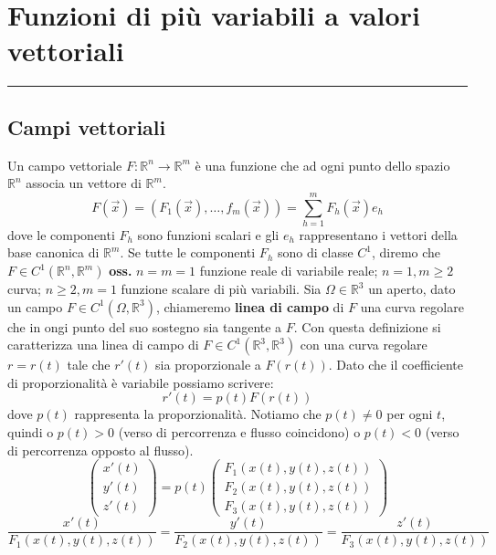 \section*{Funzioni di più variabili a valori vettoriali}
\rule{\textwidth}{2pt}
\subsection*{Campi vettoriali}
Un campo vettoriale $F: \mathbb{R}^n \rightarrow  \mathbb{R}^m$ è una funzione che ad ogni  punto dello spazio $\mathbb{R}^n$ associa un vettore di $\mathbb{R}^m$.
\[
    F(\vec{x}) = \left(F_1(\vec{x}), \dots, f_m(\vec{x})\right) = \sum_{h=1}^{m} F_h(\vec{x})e_h
\]
dove le componenti $F_h$ sono funzioni scalari e gli $e_h$ rappresentano i vettori della base canonica di $\mathbb{R}^m$. Se tutte le componenti $F_h$ sono di classe $C^1$, diremo che $F \in C^1(\mathbb{R}^n, \mathbb{R}^m)$\newline
\newline
\textbf{oss.} $n=m=1$ funzione reale di variabile reale; $n=1, m \geq 2$ curva; $n \geq 2, m = 1$ funzione scalare di più variabili.\newline
\newline
Sia $\Omega \in \mathbb{R}^3$ un aperto, dato un campo $F \in C^1(\Omega, \mathbb{R}^3)$, chiameremo \textbf{linea di campo} di $F$ una curva regolare che in ongi punto del suo sostegno sia tangente a $F$.\newline
Con questa definizione si caratterizza una linea di campo di $F \in C^1(\mathbb{R}^3, \mathbb{R}^3)$ con una curva regolare $r = r(t)$ tale che $r'(t)$ sia proporzionale a $F(r(t))$. Dato che il coefficiente di proporzionalità è variabile possiamo scrivere:
\[
    r'(t) = p(t) F(r(t))
\]
dove $p(t)$ rappresenta la proporzionalità. Notiamo che $p(t) \neq 0$ per ogni $t$, quindi o $p(t) > 0$ (verso di percorrenza e flusso coincidono) o $p(t) < 0$ (verso di percorrenza opposto al flusso).
\[
    \left(\begin{matrix}
        x'(t)\\
        y'(t)\\
        z'(t)
    \end{matrix}\right) = p(t) \left(\begin{matrix}
        F_1(x(t),y(t),z(t))\\
        F_2(x(t),y(t),z(t))\\
        F_3(x(t),y(t),z(t))
    \end{matrix}\right)
\]
\[
    \frac{x'(t)}{F_1(x(t),y(t),z(t))} = 
    \frac{y'(t)}{F_2(x(t),y(t),z(t))} = 
    \frac{z'(t)}{F_3(x(t),y(t),z(t))}
\]
